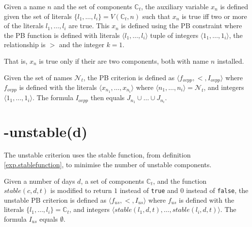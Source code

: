 \begin{defs}
Given a name $n$ and the set of components $\mathbb{C}_t$,
the auxiliary variable $x_n$ is defined given the set of literals $\{l_1,\ldots,l_i\} = V(\mathbb{C}_t ,n)$ 
such that $x_n$ is true iff two or more of the literals $l_1, \ldots, l_i$ are true.
This $x_n$ is defined using the PB constraint where the PB function is defined with literals $\langle l_1,\ldots,l_i\rangle$ tuple of integers 
$\langle 1_1, \ldots ,1_i\rangle$, the relationship is $>$ and the integer $k = 1$.
\end{defs}
That is, $x_n$ is true only if their are two components, both with name $n$ installed.

\begin{defs}
Given the set of names $\mathcal{N}_t$, the PB criterion is defined as $\langle f_{ovpp}, <, I_{ovpp} \rangle$ where 
$f_{ovpp}$ is defined with the literals $\langle x_{n_1},\ldots, x_{n_i}\rangle$ where $\langle n_1,\ldots, n_i \rangle = \mathcal{N}_t$, and integers $\langle 1_1,\ldots,1_i\rangle$.
The formula $I_{ovpp}$ then equals $J_{n_1} \cup \ldots \cup J_{n_i}$.
\end{defs}

\section{-unstable(d)}
The unstable criterion uses the stable function, from definition \ref{exp.stablefunction}, to minimise the number of unstable components.

\begin{defs}
Given a number of days $d$, a set of components $\mathbb{C}_t$, and the function $stable(c,d,t)$ is modified to return $1$ instead of \texttt{true} and $0$ instead of \texttt{false},
the unstable PB criterion is defined as $\langle f_{us}, <, I_{us} \rangle$ where 
$f_{us}$ is defined with the literals $\{l_1,\ldots,l_i\} = \mathbb{C}_t$, and integers $\langle stable(l_1,d,t), \ldots ,stable(l_i,d,t)\rangle$.
The formula $I_{us}$ equals $\emptyset$.
\end{defs}
